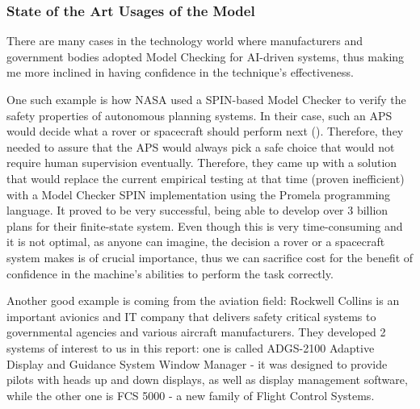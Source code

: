 \documentclass[paper=a4, fontsize=11pt]{scrartcl} %
\numberwithin{equation}{section} %
\numberwithin{figure}{section} %
\numberwithin{table}{section} %
\begin{document}

\subsubsection{State of the Art Usages of the Model}

\par
There are many cases in the technology world where manufacturers and government bodies adopted Model Checking for AI-driven systems, thus making me more inclined in having confidence in the technique's effectiveness. \\

\par
One such example is how NASA used a SPIN-based Model Checker to verify the safety properties of autonomous planning systems. In their case, such an APS  would decide what a rover or spacecraft should perform next (\citet{nasa-spin}). Therefore, they needed to assure that the APS would always pick a safe choice that would not require human supervision eventually. Therefore, they came up with a solution that would replace the current empirical testing at that time (proven inefficient) with a Model Checker SPIN implementation using the Promela programming language. It proved to be very successful, being able to develop over 3 billion plans for their finite-state system. Even though this is very time-consuming and it is not optimal, as anyone can imagine, the decision a rover or a spacecraft system makes is of crucial importance, thus we can sacrifice cost for the benefit of confidence in the machine's abilities to perform the task correctly. \\

\par
Another good example is coming from the aviation field: Rockwell Collins is an important avionics and IT company that delivers safety critical systems to governmental agencies and various aircraft manufacturers. They developed 2 systems of interest to us in this report: one is called ADGS-2100 Adaptive Display and Guidance System Window Manager - it was designed to provide pilots with heads up and down displays, as well as display management software, while the other one is FCS 5000 - a new family of Flight Control Systems. \\
\end{document}
